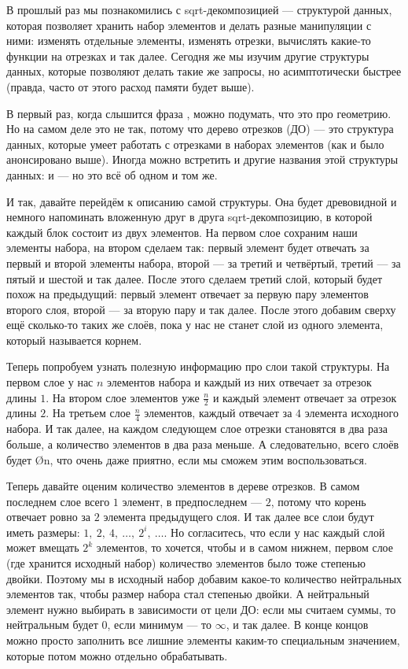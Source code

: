 В прошлый раз мы познакомились с sqrt-декомпозицией — структурой данных, которая позволяет хранить набор элементов и делать разные манипуляции с ними: изменять отдельные элементы, изменять отрезки, вычислять какие-то функции на отрезках и так далее. Сегодня же мы изучим другие структуры данных, которые позволяют делать такие же запросы, но асимптотически быстрее (правда, часто от этого расход памяти будет выше).


В первый раз, когда слышится фраза , можно подумать, что это про геометрию. Но на самом деле это не так, потому что дерево отрезков (ДО) — это структура данных, которые умеет работать с отрезками в наборах элементов (как и было анонсировано выше). Иногда можно встретить и другие названия этой структуры данных:  и  — но это всё об одном и том же.

И так, давайте перейдём к описанию самой структуры. Она будет древовидной и немного напоминать вложенную друг в друга sqrt-декомпозицию, в которой каждый блок состоит из двух элементов. На первом слое сохраним наши элементы набора, на втором сделаем так: первый элемент будет отвечать за первый и второй элементы набора, второй — за третий и четвёртый, третий — за пятый и шестой и так далее. После этого сделаем третий слой, который будет похож на предыдущий: первый элемент отвечает за первую пару элементов второго слоя, второй — за вторую пару и так далее. После этого добавим сверху ещё сколько-то таких же слоёв, пока у нас не станет слой из одного элемента, который называется корнем.

Теперь попробуем узнать полезную информацию про слои такой структуры. На первом слое у нас $n$ элементов набора и каждый из них отвечает за отрезок длины $1$. На втором слое элементов уже $\frac{n}{2}$ и каждый элемент отвечает за отрезок длины $2$. На третьем слое $\frac{n}{4}$ элементов, каждый отвечает за $4$ элемента исходного набора. И так далее, на каждом следующем слое отрезки становятся в два раза больше, а количество элементов в два раза меньше. А следовательно, всего слоёв будет \O{\log n}, что очень даже приятно, если мы сможем этим воспользоваться.

Теперь давайте оценим количество элементов в дереве отрезков. В самом последнем слое всего $1$ элемент, в предпоследнем — $2$, потому что корень отвечает ровно за $2$ элемента предыдущего слоя. И так далее все слои будут иметь размеры: $1,\ 2,\ 4,\ \ldots,\ 2^i,\ \ldots$. Но согласитесь, что если у нас каждый слой может вмещать $2^k$ элементов, то хочется, чтобы и в самом нижнем, первом слое (где хранится исходный набор) количество элементов было тоже степенью двойки. Поэтому мы в исходный набор добавим какое-то количество нейтральных элементов так, чтобы размер набора стал степенью двойки. А нейтральный элемент нужно выбирать в зависимости от цели ДО: если мы считаем суммы, то нейтральным будет $0$, если минимум — то $\infty$, и так далее. В конце концов можно просто заполнить все лишние элементы каким-то специальным значением, которые потом можно отдельно обрабатывать.

